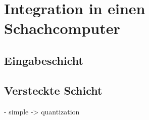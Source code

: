 
\section{Integration in einen Schachcomputer}

\subsection{Eingabeschicht}


\subsection{Versteckte Schicht}
- simple -> quantization